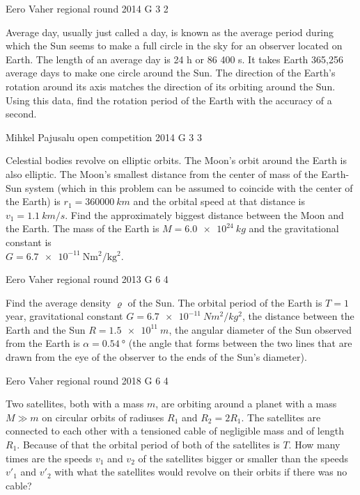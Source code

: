 \documentclass[11pt]{article}
\begin{document}
{Eero Vaher} %
{regional round} %
{2014} %
{G 3} %
{2} %
{

\ifEngStatement
Average day, usually just called a day, is known as the average period during which the Sun seems to make a full circle in the sky for an observer located on Earth. The length of an average day is 24 h or 86 400 s. It takes Earth 365,256 average days to make one circle around the Sun. The direction of the Earth’s rotation around its axis matches the direction of its orbiting around the Sun. Using this data, find the rotation period of the Earth with the accuracy of a second.
\fi
}

{Mihkel Pajusalu} %
{open competition} %
{2014} %
{G 3} %
{3} %
{

\ifEngStatement
Celestial bodies revolve on elliptic orbits. The Moon’s orbit around the Earth is also elliptic. The Moon’s smallest distance from the center of mass of the Earth-Sun system (which in this problem can be assumed to coincide with the center of the Earth) is $r_{1}=\SI{360000}{km}$ and the orbital speed at that distance is $v_1=\SI{1.1}{km/s}$. Find the approximately biggest distance between the Moon and the Earth. The mass of the Earth is $M=\SI{6.0e24}{kg}$ and the gravitational constant is\\ $G=\SI{6.7e-11}{\newton\metre\squared\per\kilo\gram\squared}$.
\fi
}

{Eero Vaher} %
{regional round} %
{2013} %
{G 6} %
{4} %
{

\ifEngStatement
Find the average density $\varrho$ of the Sun. The orbital period of the Earth is $T=1$ year, gravitational constant $G=\SI{6.7e-11}{N m^2/kg^2}$, the distance between the Earth and the Sun $R=\SI{1.5e11}{m}$, the angular diameter of the Sun observed from the Earth is $\alpha=\SI{0,54}{\degree}$ (the angle that forms between the two lines that are drawn from the eye of the observer to the ends of the Sun’s diameter).
\fi
}

{Eero Vaher} %
{regional round} %
{2018} %
{G 6} %
{4} %
{

\ifEngStatement
Two satellites, both with a mass $m$, are orbiting around a planet with a mass $M\gg m$ on circular orbits of radiuses $R_1$ and $R_2=2R_1$. The satellites are connected to each other with a tensioned cable of negligible mass and of length $R_1$. Because of that the orbital period of both of the satellites is $T$. How many times are the speeds $v_1$ and $v_2$ of the satellites bigger or smaller than the speeds $v'_1$ and $v'_2$ with what the satellites would revolve on their orbits if there was no cable?
\fi
}
\end{document}
